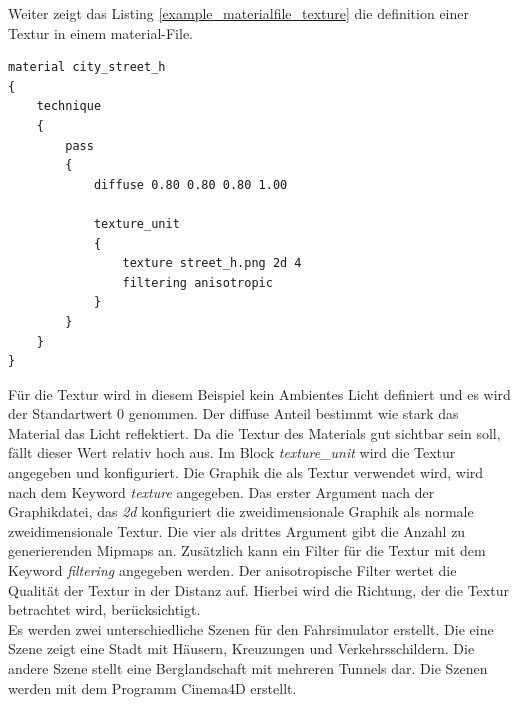 Weiter zeigt das Listing \ref{example_materialfile_texture} die definition einer Textur in einem material-File.
\begin{lstlisting}[caption={Beispiel aus dem material-File für eine Textur},label={example_materialfile_texture}]
material city_street_h
{
	technique
	{
		pass
		{
			diffuse 0.80 0.80 0.80 1.00

			texture_unit
			{
				texture street_h.png 2d 4
				filtering anisotropic
			}
		}
	}
}
\end{lstlisting}
Für die Textur wird in diesem Beispiel kein Ambientes Licht definiert und es wird der Standartwert 0 genommen. Der diffuse Anteil bestimmt wie stark das Material das Licht reflektiert. Da die Textur des Materials gut sichtbar sein soll, fällt dieser Wert relativ hoch aus. Im Block \textit{texture\_unit} wird die Textur angegeben und konfiguriert. Die Graphik die als Textur verwendet wird, wird nach dem Keyword \textit{texture} angegeben. Das erster Argument nach der Graphikdatei, das \textit{2d} konfiguriert die zweidimensionale Graphik als normale zweidimensionale Textur. Die vier als drittes Argument gibt die Anzahl zu generierenden Mipmaps an. Zusätzlich kann ein Filter für die Textur mit dem Keyword \textit{filtering} angegeben werden. Der anisotropische Filter wertet die Qualität der Textur in der Distanz auf. Hierbei wird die Richtung, der die Textur betrachtet wird, berücksichtigt.\\
Es werden zwei unterschiedliche Szenen für den Fahrsimulator erstellt. Die eine Szene zeigt eine Stadt mit Häusern, Kreuzungen und Verkehrsschildern. Die andere Szene stellt eine Berglandschaft mit mehreren Tunnels dar. Die Szenen werden mit dem Programm Cinema4D erstellt. 
